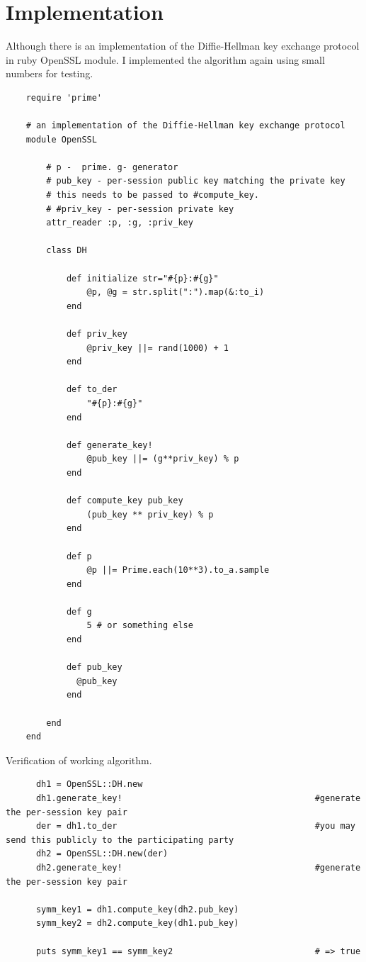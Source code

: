 \documentclass{article}
\begin{document}
  \section{Implementation}

  Although  there is an implementation of the Diffie-Hellman key exchange protocol in ruby OpenSSL module. I implemented the algorithm again using
  small numbers for testing.

    \begin{lstlisting}
    require 'prime'

    # an implementation of the Diffie-Hellman key exchange protocol
    module OpenSSL

        # p -  prime. g- generator 
        # pub_key - per-session public key matching the private key
        # this needs to be passed to #compute_key.
        # #priv_key - per-session private key
        attr_reader :p, :g, :priv_key

        class DH

            def initialize str="#{p}:#{g}"
                @p, @g = str.split(":").map(&:to_i)
            end

            def priv_key
                @priv_key ||= rand(1000) + 1
            end

            def to_der
                "#{p}:#{g}"
            end

            def generate_key!
                @pub_key ||= (g**priv_key) % p
            end

            def compute_key pub_key
                (pub_key ** priv_key) % p
            end

            def p
                @p ||= Prime.each(10**3).to_a.sample
            end

            def g 
                5 # or something else
            end

            def pub_key 
              @pub_key 
            end
        
        end
    end
    \end{lstlisting}

    Verification of working algorithm. 

    \begin{lstlisting}
      dh1 = OpenSSL::DH.new
      dh1.generate_key!                                      #generate the per-session key pair
      der = dh1.to_der                                       #you may send this publicly to the participating party
      dh2 = OpenSSL::DH.new(der)
      dh2.generate_key!                                      #generate the per-session key pair

      symm_key1 = dh1.compute_key(dh2.pub_key)
      symm_key2 = dh2.compute_key(dh1.pub_key)

      puts symm_key1 == symm_key2                            # => true
    \end{lstlisting}
\end{document}
